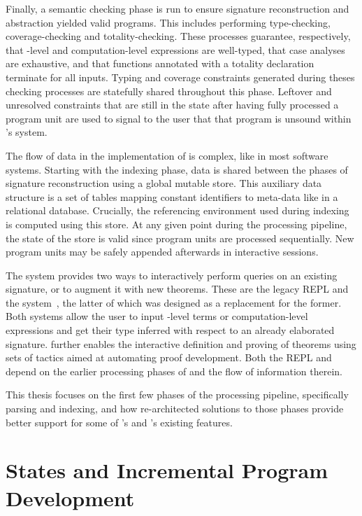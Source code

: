Finally, a semantic checking phase is run to ensure signature reconstruction and abstraction yielded valid programs.
This includes performing type-checking, coverage-checking and totality-checking.
These processes guarantee, respectively, that \LF-level and computation-level expressions are well-typed, that case analyses are exhaustive, and that functions annotated with a totality declaration terminate for all inputs.
Typing and coverage constraints generated during theses checking processes are statefully shared throughout this phase.
Leftover and unresolved constraints that are still in the state after having fully processed a program unit are used to signal to the user that that program is unsound within \Beluga's system.

The flow of data in the implementation of \Beluga is complex, like in most software systems.
Starting with the indexing phase, data is shared between the phases of signature reconstruction using a global mutable store.
This auxiliary data structure is a set of tables mapping constant identifiers to meta-data like in a relational database.
Crucially, the referencing environment used during indexing is computed using this store.
At any given point during the processing pipeline, the state of the store is valid since program units are processed sequentially.
New program units may be safely appended afterwards in interactive sessions.

The \Beluga system provides two ways to interactively perform queries on an existing \Beluga signature, or to augment it with new theorems.
These are the legacy \ac{REPL} and the \Harpoon system~\cite{errington2021harpoon}, the latter of which was designed as a replacement for the former.
Both systems allow the user to input \LF-level terms or computation-level expressions and get their type inferred with respect to an already elaborated \Beluga signature.
\Harpoon further enables the interactive definition and proving of theorems using sets of tactics aimed at automating proof development.
Both the \ac{REPL} and \Harpoon depend on the earlier processing phases of \Beluga and the flow of information therein.

This thesis focuses on the first few phases of the \Beluga processing pipeline, specifically parsing and indexing, and how re-architected solutions to those phases provide better support for some of \Beluga's and \Harpoon's existing features.

\section{States and Incremental Program Development}

